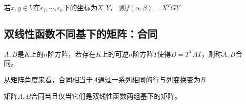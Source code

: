 \begin{theorem}[双线性函数度量矩阵唯一确定]
  若$x,y \in V$在$\epsilon_1,\cdots,\epsilon_n$下的坐标为$X,Y$，
  则$f(\alpha,\beta) = X^TGY$
\end{theorem}

\subsection{双线性函数不同基下的矩阵：合同}

\begin{definition}[合同]
  $A,B$是$K$上的$n$阶方阵，若存在$K$上的可逆$n$阶方阵$T$使得$B = T^TAT$，则称$A,B$合同。
\end{definition}

\begin{note}
  从矩阵角度来看，合同相当于$A$通过一系列相同的行与列变换变为$B$
\end{note}

\begin{theorem}[不同基下度量矩阵关系]
  矩阵$A,B$合同当且仅当它们是双线性函数两组基下的矩阵。
\end{theorem}

